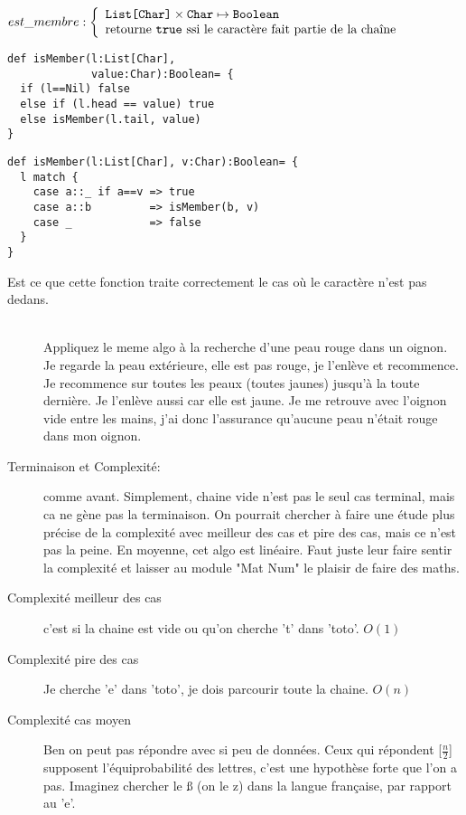 \documentclass[10pt]{article}\usepackage[nu]{esial}
\begin{document}
\begin{Question}
  $est\_membre: \left\{
    \begin{array}{l}
      \text{\texttt{List[Char]}}\times \text{\texttt{Char}}\mapsto \text{\texttt{Boolean}}\\
      \text{retourne \text{\texttt{true}} ssi le caractère fait partie de la chaîne}
    \end{array}\right.$  
\end{Question}
\begin{Reponse}
\noindent
  \begin{minipage}{.43\linewidth}
  \begin{Verbatim}
def isMember(l:List[Char], 
             value:Char):Boolean= {
  if (l==Nil) false
  else if (l.head == value) true
  else isMember(l.tail, value)
}

  \end{Verbatim}    
  \end{minipage}
  \begin{minipage}{.55\linewidth}
  \begin{Verbatim}[numbers=right]
def isMember(l:List[Char], v:Char):Boolean= {
  l match {
    case a::_ if a==v => true
    case a::b         => isMember(b, v)
    case _            => false
  }
}
  \end{Verbatim}        
  \end{minipage}

  \begin{description}
  \item[Est ce que cette fonction traite correctement le cas où le caractère
    n'est pas dedans.] ~\\ Appliquez le meme algo à la recherche d'une peau
    rouge dans un oignon. Je regarde la peau extérieure, elle est pas rouge, je
    l'enlève et recommence. Je recommence sur toutes les peaux (toutes jaunes)
    jusqu'à la toute dernière. Je l'enlève aussi car elle est jaune. Je me
    retrouve avec l'oignon vide entre les mains, j'ai donc l'assurance qu'aucune
    peau n'était rouge dans mon oignon.
  \item[Terminaison et Complexité:] comme avant. Simplement, chaine vide n'est
    pas le seul cas terminal, mais ca ne gène pas la terminaison. On pourrait
    chercher à faire une étude plus précise de la complexité avec meilleur des
    cas et pire des cas, mais ce n'est pas la peine. En moyenne, cet algo est
    linéaire. Faut juste leur faire sentir la complexité et laisser au module
    "Mat Num" le plaisir de faire des maths.
  \item[Complexité meilleur des cas] c'est si la chaine est vide ou qu'on
    cherche 't' dans 'toto'. $O(1)$
  \item[Complexité pire des cas] Je cherche 'e' dans 'toto', je dois parcourir
    toute la chaine. $O(n)$
  \item[Complexité cas moyen] Ben on peut pas répondre avec si peu de
    données. Ceux qui répondent [$\frac{n}{2}$] supposent l'équiprobabilité des
    lettres, c'est une hypothèse forte que l'on a pas. Imaginez chercher le ß
    (on le z) dans la langue française, par rapport au 'e'.
  \end{description}
\end{Reponse}
\end{document}
